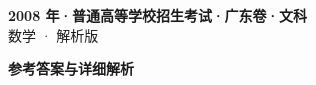 \documentclass[zihao=-4, a4paper]{ctexart}
\begin{document}
\begin{center}
  {\Large\bfseries 2008 年·普通高等学校招生考试·广东卷·文科}\\[4pt]
  {\large 数学 · 解析版}
\end{center}
\medskip
{}

\clearpage
{}
\begin{center}{\Large\bfseries 参考答案与详细解析}\end{center}
\medskip

\end{document}
